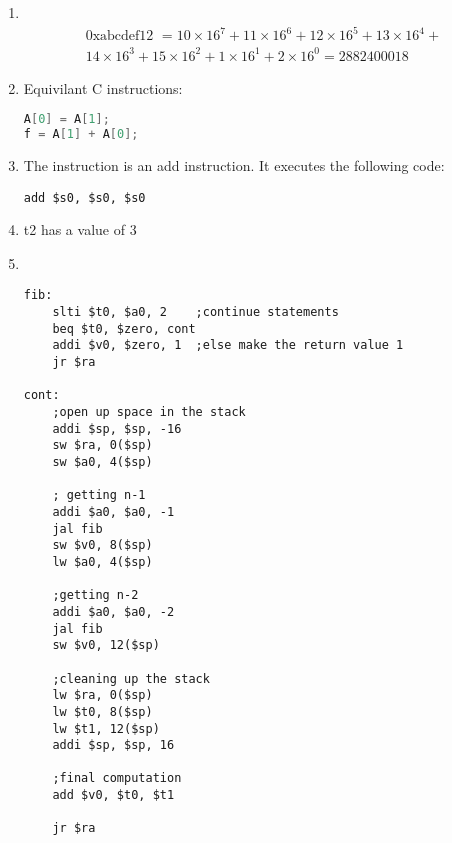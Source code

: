 \documentclass{3330hw}
\begin{document}
\begin{enumerate}
\item ~
\begin{multline*}
\text{0xabcdef12 } = 10\times16^7 + 11\times16^6 + 12\times16^5 + 13\times16^4 +\\ 14\times16^3 + 15\times16^2 + 1\times16^1 + 2\times16^0 = 2882400018
\end{multline*}

\item Equivilant C instructions:
\begin{lstlisting}[language=c]
A[0] = A[1];
f = A[1] + A[0];
\end{lstlisting}

\item The instruction is an add instruction. It executes the following code: 
\begin{lstlisting}
add $s0, $s0, $s0
\end{lstlisting}

\item t2 has a value of 3

\item ~
\begin{lstlisting}
fib:
	slti $t0, $a0, 2	;continue statements 
	beq $t0, $zero, cont
	addi $v0, $zero, 1	;else make the return value 1 
	jr $ra

cont:									 
	;open up space in the stack
	addi $sp, $sp, -16  
	sw $ra, 0($sp)		
	sw $a0, 4($sp)
 
	; getting n-1
	addi $a0, $a0, -1   
	jal fib			    
	sw $v0, 8($sp)	    
	lw $a0, 4($sp)	    
	
	;getting n-2
	addi $a0, $a0, -2   
	jal fib
	sw $v0, 12($sp)	    
	
	;cleaning up the stack
	lw $ra, 0($sp)		
	lw $t0, 8($sp)	    
	lw $t1, 12($sp)	   
	addi $sp, $sp, 16
	
	;final computation
	add $v0, $t0, $t1	
 
	jr $ra

\end{lstlisting}
\end{enumerate}
\end{document}
